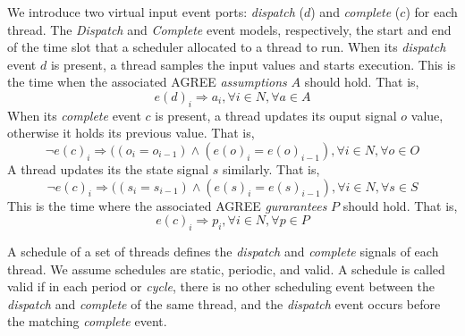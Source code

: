 We introduce two virtual input event ports: \emph{dispatch} ($d$) and \emph{complete} ($c$) for each thread.  The \emph{Dispatch} and \emph{Complete} event models, respectively, the start and end of the time slot that a scheduler allocated to a thread to run. 
When its \emph{dispatch} event $d$ is present, a thread samples the input values and starts execution. This is the time when the associated AGREE \emph{assumptions} $A$ should hold. That is,
$$e(d)_i \Rightarrow a_i, \forall i\in N, \forall a \in A $$
When its \emph{complete} event $c$ is present, a thread updates its ouput signal $o$ value, otherwise it holds its previous value. That is, 
$$\lnot e(c)_i \Rightarrow ((o_i = o_{i-1}) \land (e(o)_i = e(o)_{i-1}), \forall i \in N, \forall o \in O$$
A thread updates its the state signal $s$ similarly. That is,
$$\lnot e(c)_i \Rightarrow ((s_i = s_{i-1}) \land (e(s)_i = e(s)_{i-1}), \forall i \in N, \forall s \in S$$
This is the time where the associated AGREE \emph{gurarantees} $P$ should hold. That is,
$$e(c)_i \Rightarrow p_i, \forall i\in N, \forall p \in P $$


A schedule of a set of threads defines the \emph{dispatch} and \emph{complete} signals of each thread. We assume schedules are static, periodic, and valid. A schedule is called valid if in each period or \emph{cycle}, there is no other scheduling event between the \emph{dispatch} and \emph{complete} of the same thread, and the \emph{dispatch} event occurs before the matching \emph{complete} event. 

